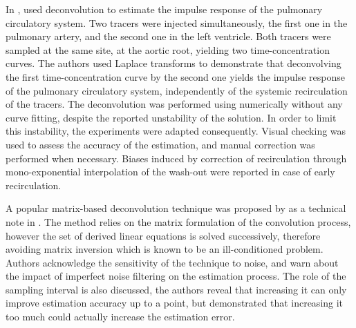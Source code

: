 In \citeyear{Maseri:1970gn}, \citet{Maseri:1970gn} used deconvolution to estimate the impulse response of the pulmonary circulatory system.
Two tracers were injected simultaneously, the first one in the pulmonary artery, and the second one in the left ventricle.
Both tracers were sampled at the same site, at the aortic root, yielding two time-concentration curves. 
The authors used Laplace transforms to demonstrate that deconvolving the first time-concentration curve by the second one yields the impulse response of the pulmonary circulatory system, independently of the systemic recirculation of the tracers. 
The deconvolution was performed using numerically without any curve fitting, despite the reported unstability of the solution.
In order to limit this instability, the experiments were adapted consequently. 
Visual checking was used to assess the accuracy of the estimation, and manual correction was performed when necessary.
Biases induced by correction of recirculation through mono-exponential interpolation of the wash-out were reported in case of early recirculation.

A popular matrix-based deconvolution technique was proposed by \citet{Valentinuzzi:1975tr} as a technical note in \citeyear{Valentinuzzi:1975tr}. 
The method relies on the matrix formulation of the convolution process, however the set of derived linear equations is solved successively, therefore avoiding matrix inversion which is known to be an ill-conditioned problem. 
Authors acknowledge the sensitivity of the technique to noise, and warn about the impact of imperfect noise filtering on the estimation process. 
The role of the sampling interval is also discussed, the authors reveal that increasing it can only improve estimation accuracy up to a point, but demonstrated that increasing it too much could actually increase the estimation error.

